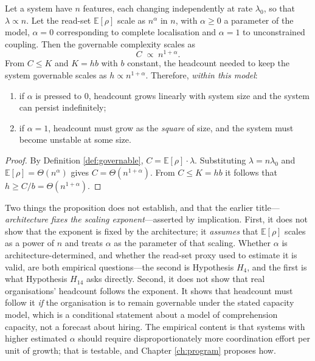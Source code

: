 \begin{proposition}\label{prop:exponent}
Let a system have $n$ features, each changing independently at rate $\lambda_0$, so that
$\lambda \propto n$. Let the read-set $\mathbb{E}[\rho]$ scale as $n^{\alpha}$ in $n$, with
$\alpha \ge 0$ a parameter of the model, $\alpha = 0$ corresponding to complete
localisation and $\alpha = 1$ to unconstrained coupling. Then the governable complexity
scales as
\begin{equation}\label{eq:exponent}
C \;\propto\; n^{1+\alpha}.
\end{equation}
From $C \le K$ and $K = hb$ with $b$ constant, the headcount needed to keep the system governable
scales as $h \propto n^{1+\alpha}$. Therefore, \emph{within this model}:
\begin{enumerate}[label=(\alph*)]
\item if $\alpha$ is pressed to $0$, headcount grows linearly with system size and the system can
      persist indefinitely;
\item if $\alpha = 1$, headcount must grow as the \emph{square} of size, and the system must
      become unstable at some size.
\end{enumerate}
\end{proposition}

\begin{proof}
By Definition \ref{def:governable}, $C = \mathbb{E}[\rho]\cdot\lambda$. Substituting
$\lambda = n\lambda_0$ and $\mathbb{E}[\rho] = \Theta(n^{\alpha})$ gives
$C = \Theta(n^{1+\alpha})$. From $C \le K = hb$ it follows that
$h \ge C/b = \Theta(n^{1+\alpha})$.
\end{proof}

Two things the proposition does not establish, and that the earlier title---\emph{architecture fixes
the scaling exponent}---asserted by implication. First, it does not show that the exponent is fixed
by the architecture; it \emph{assumes} that $\mathbb{E}[\rho]$ scales as a power of $n$ and treats
$\alpha$ as the parameter of that scaling. Whether $\alpha$ is architecture-determined, and whether
the read-set proxy used to estimate it is valid, are both empirical questions---the second is
Hypothesis $H_4$, and the first is what Hypothesis $H_{14}$ asks directly. Second, it does not show
that real organisations' headcount follows the exponent. It shows that headcount must follow it
\emph{if} the organisation is to remain governable under the stated capacity model, which is a
conditional statement about a model of comprehension capacity, not a forecast about hiring. The
empirical content is that systems with higher estimated $\alpha$ should require disproportionately
more coordination effort per unit of growth; that is testable, and Chapter \ref{ch:program} proposes
how.

